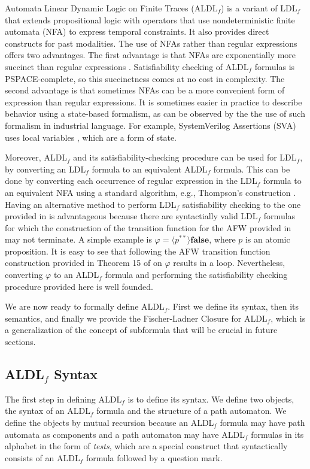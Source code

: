 \documentclass{lmcs}
\theoremstyle{definition}
\newcommand{\dbox}[1]{\langle #1 \rangle}
\DeclareMathOperator{\?}{?}
\begin{document}
\label{ch:introducingaldlf}
Automata Linear Dynamic Logic on Finite Traces (ALDL$_f$) is a variant of LDL$_f$ that extends propositional logic with operators that use nondeterministic finite automata (NFA) to express temporal constraints. It also provides direct constructs for past modalities. The use of NFAs rather than regular expressions offers two advantages. The first advantage is that NFAs are exponentially more succinct than regular expressions \cite{gruber1,gruber2}. Satisfiability checking of ALDL$_f$ formulas is PSPACE-complete, so this succinctness comes at no cost in complexity. The second advantage is that sometimes NFAs can be a more convenient form of expression than regular expressions. It is sometimes easier in practice to describe behavior using a state-based formalism, as can be observed by the the use of such formalism in industrial language. For example, SystemVerilog Assertions (SVA) uses local variables \cite{sva}, which are a form of state.

Moreover, ALDL$_f$ and its satisfiability-checking procedure can be used for LDL$_f$, by converting an LDL$_f$ formula to an equivalent ALDL$_f$ formula. This can be done by converting each occurrence of regular expression in the LDL$_f$ formula to an equivalent NFA using a standard algorithm, e.g., Thompson's construction \cite{thompson}. Having an alternative method to perform LDL$_f$ satisfiability checking to the one provided in \cite{ldlf} is advantageous because there are syntactially valid LDL$_f$ formulas for which the construction of the transition function for the AFW provided in \cite{ldlf} may not terminate. A simple example is $\varphi = \dbox{p^{**}}\textbf{false}$, where $p$ is an atomic proposition. It is easy to see that following the AFW transition function construction provided in Theorem 15 of \cite{ldlf} on $\varphi$ results in a loop. Nevertheless, converting $\varphi$ to an ALDL$_f$ formula and performing the satisfiability checking procedure provided here is well founded.

We are now ready to formally define ALDL$_f$. First we define its syntax, then its semantics, and finally we provide the Fischer-Ladner Closure for ALDL$_f$, which is a generalization of the concept of subformula that will be crucial in future sections.

\subsection{\texorpdfstring{ALDL$_f$ Syntax}{ALDLf Syntax}}
The first step in defining ALDL$_f$ is to define its syntax. We define two objects, the syntax of an ALDL$_f$ formula and the structure of a path automaton.
We define the objects by mutual recursion because an ALDL$_f$ formula may have path automata as components
and a path automaton may have ALDL$_f$ formulas in its alphabet in the form of \textit{tests}, which are a special construct
that syntactically consists of an ALDL$_f$ formula followed by a question mark.
\end{document}
